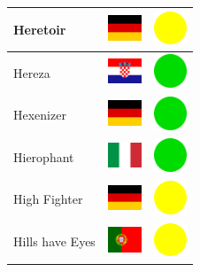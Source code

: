 \documentclass[12pt, a4paper, twoside]{report}
\begin{document}
\begin{center}
\begin{longtable}{|p{5cm}|p{2cm}|p{2cm}|}
Heretoir & \includegraphics[width=1cm]{4x3/de} & \includegraphics[width=1cm]{likes/m} \\ \hline
Hereza & \includegraphics[width=1cm]{4x3/hr} & \includegraphics[width=1cm]{likes/y} \\ \hline
Hexenizer & \includegraphics[width=1cm]{4x3/de} & \includegraphics[width=1cm]{likes/y} \\ \hline
Hierophant & \includegraphics[width=1cm]{4x3/it} & \includegraphics[width=1cm]{likes/y} \\ \hline
High Fighter & \includegraphics[width=1cm]{4x3/de} & \includegraphics[width=1cm]{likes/m} \\ \hline
Hills have Eyes & \includegraphics[width=1cm]{4x3/pt} & \includegraphics[width=1cm]{likes/m} \\ \hline

\end{longtable}
\end{center}
\end{document}
